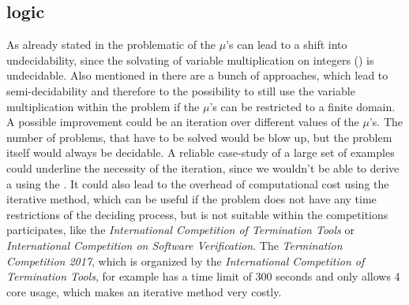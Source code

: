 \subsection{\solver logic}
As already stated in  the problematic of the $\mu$'s can lead to a shift into undecidability, since the solvating of variable multiplication on integers (\qfnia) is undecidable. Also mentioned in  there are a bunch of approaches, which lead to semi-decidability and therefore to the possibility to still use the variable multiplication within the problem if the $\mu$'s can be restricted to a finite domain.\newline
A possible improvement could be an iteration over different values of the $\mu$'s. The number of problems, that have to be solved would be blow up, but the problem itself would always be decidable.\newline
A reliable case-study of a large set of examples could underline the necessity of the iteration, since we wouldn't be able to derive a \gna using the \qfnia. It could also lead to the overhead of computational cost using the iterative method, which can be useful if the problem does not have any time restrictions of the deciding process, but is not suitable within the competitions \aprove participates, like the \textit{International Competition of Termination Tools} or \textit{International Competition on Software Verification}. \cite{aproveWebsite} \cite{TermComp} \cite{SVComp} \newline
The \textit{Termination Competition 2017}, which is organized by the \textit{International Competition of Termination Tools}, for example has a time limit of 300 seconds and only allows 4 core usage, which makes an iterative method very costly. \cite{wiki2017termComp}

